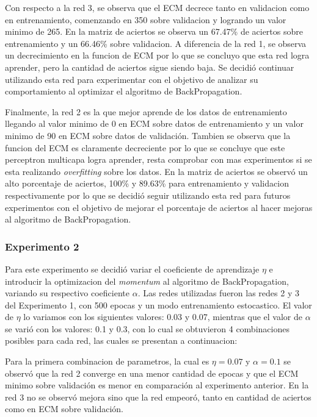  Con respecto a la red 3, se observa que el ECM decrece tanto en validacion como en entrenamiento, comenzando en 350 sobre validacion y
 logrando un valor minimo de 265. En la matriz de aciertos se observa un 67.47\% de aciertos sobre entrenamiento y un 66.46\% sobre validacion.
 A diferencia de la red 1, se observa un decrecimiento en la funcion de ECM por lo que se concluyo que esta red logra aprender, pero la cantidad
 de aciertos sigue siendo baja. Se decidió continuar utilizando esta red para experimentar con el objetivo de analizar su comportamiento al optimizar
 el algoritmo de BackPropagation.

 Finalmente, la red 2 es la que mejor aprende de los datos de entrenamiento llegando al valor minimo de 0 en ECM sobre datos de entrenamiento y un valor minimo
 de 90 en ECM sobre datos de validación. Tambien se observa que la funcion del ECM es claramente decreciente por lo que se concluye que este perceptron multicapa
 logra aprender, resta comprobar con mas experimentos si se esta realizando \textit{overfitting} sobre los datos. En la matriz de aciertos se observó un alto
 porcentaje de aciertos, 100\% y 89.63\% para entrenamiento y validacion respectivamente por lo que se decidió seguir utilizando esta red para futuros experimentos
 con el objetivo de mejorar el porcentaje de aciertos al hacer mejoras al algoritmo de BackPropagation.

\subsubsection{Experimento 2}
Para este experimento se decidió variar el coeficiente de aprendizaje $\eta$ e introducir la optimizacion del \textit{momentum} al algoritmo de BackPropagation,
variando su respectivo coeficiente $\alpha$.
Las redes utilizadas fueron las redes 2 y 3 del Experimento 1, con 500 epocas y un modo entrenamiento estocastico. El valor de $\eta$ lo variamos con los
siguientes valores: 0.03 y 0.07, mientras que el valor de $\alpha$ se varió con los valores: 0.1 y 0.3, con lo cual se obtuvieron 4 combinaciones
posibles para cada red, las cuales se presentan a continuacion:

Para la primera combinacion de parametros, la cual es $\eta = 0.07$ y $\alpha = 0.1$ se observó que la red 2 converge en una menor cantidad de epocas
 y que el ECM minimo sobre validación es menor en comparación al experimento anterior. %
 En la red 3 no se observó mejora sino que la red empeoró, tanto en cantidad de aciertos como en ECM sobre validación.

